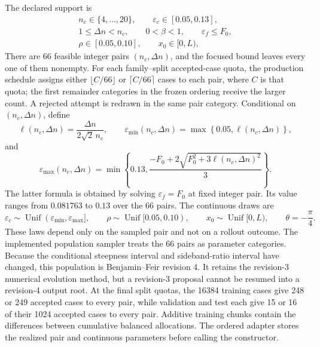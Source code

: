 \documentclass[11pt]{article}
\newcommand{\eps}{\varepsilon}
\begin{document}
The declared support is
\begin{equation}
  \begin{gathered}
  n_c\in\{4,\ldots,20\},\qquad
  \eps_c\in[0.05,0.13],\\
  1\leq\Delta n<n_c,\qquad
  0<\beta<1,\qquad \eps_f\leq F_0,\\
  \rho\in[0.05,0.10],\qquad x_0\in[0,L),
  \end{gathered}
  \label{eq:bf-support}
\end{equation}
There are 66 feasible integer pairs $(n_c,\Delta n)$, and the focused
bound leaves every one of them nonempty.  For each family--split
accepted-case quota, the production schedule assigns either
$\lfloor C/66\rfloor$ or $\lceil C/66\rceil$ cases to each pair, where $C$
is that quota; the first remainder categories in the frozen ordering receive the
larger count.  A rejected attempt is redrawn in the same pair category.
Conditional
on $(n_c,\Delta n)$, define
\begin{equation}
  \ell(n_c,\Delta n)
  =\frac{\Delta n}{2\sqrt2\,n_c},\qquad
  \eps_{\min}(n_c,\Delta n)
  =
  \max\!\left\{0.05,\ell(n_c,\Delta n)\right\},
  \label{eq:bf-conditional-lower-bound}
\end{equation}
and
\begin{equation}
  \eps_{\max}(n_c,\Delta n)
  =\min\!\left\{0.13,
    \frac{-F_0+2\sqrt{F_0^2+3\ell(n_c,\Delta n)^2}}{3}
  \right\}.
  \label{eq:bf-conditional-upper-bound}
\end{equation}
The latter formula is obtained by solving $\eps_f=F_0$ at fixed integer
pair.  Its value ranges from $0.081763$ to $0.13$ over the 66 pairs.
The continuous draws are
\begin{equation}
  \eps_c\sim
    \operatorname{Unif}(\eps_{\min},\eps_{\max}],\qquad
  \rho\sim\operatorname{Unif}[0.05,0.10),\qquad
  x_0\sim\operatorname{Unif}[0,L),\qquad
  \theta=-\frac{\pi}{4}.
  \label{eq:bf-continuous-laws}
\end{equation}
These laws depend only on the sampled pair and not on a rollout outcome.
The implemented population sampler treats the 66 pairs as parameter categories.
Because the conditional steepness interval and sideband-ratio interval have
changed, this population is Benjamin--Feir revision 4.  It retains the
revision-3 numerical evolution method, but a revision-3 proposal cannot be
resumed into a revision-4 output root.
At the final split quotas, the 16384 training cases give 248 or 249 accepted
cases to every pair, while validation and test each give 15 or 16 of their
1024 accepted cases to every pair.  Additive training chunks contain the
differences between cumulative balanced allocations.  The ordered adapter
stores the realized pair and continuous parameters before calling the
constructor.
\end{document}
